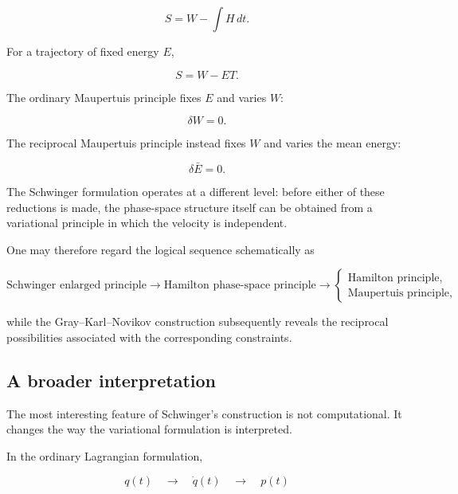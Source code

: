 \begin{equation}
S=W-\int H\,dt.
\end{equation}

For a trajectory of fixed energy \(E\),

\begin{equation}
S=W-E T.
\end{equation}

The ordinary Maupertuis principle fixes \(E\) and varies \(W\):

\begin{equation}
\delta W=0.
\end{equation}

The reciprocal Maupertuis principle instead fixes \(W\) and varies the mean energy:

\begin{equation}
\delta\bar E=0.
\end{equation}

The Schwinger formulation operates at a different level: before either of these reductions is made, the phase-space structure itself can be obtained from a variational principle in which the velocity is independent.

One may therefore regard the logical sequence schematically as

\begin{equation}
\boxed{
\text{Schwinger enlarged principle}
\longrightarrow
\text{Hamilton phase-space principle}
\longrightarrow
\begin{cases}
\text{Hamilton principle},\\
\text{Maupertuis principle},
\end{cases}
}
\end{equation}

while the Gray--Karl--Novikov construction subsequently reveals the reciprocal possibilities associated with the corresponding constraints.

\subsection{A broader interpretation}

The most interesting feature of Schwinger's construction is not computational. It changes the way the variational formulation is interpreted.

In the ordinary Lagrangian formulation,

\[
q(t)\quad\longrightarrow\quad
\dot q(t)\quad\longrightarrow\quad
p(t)
\]

